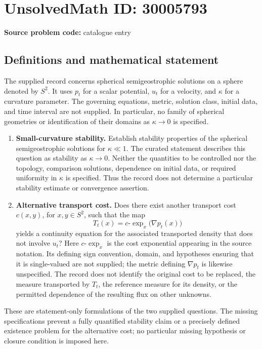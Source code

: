 \documentclass[11pt]{article}
\begin{document}
\section*{UnsolvedMath ID: 30005793}
\textbf{Source problem code:} catalogue entry
\subsection{Definitions and mathematical statement}
The supplied record concerns spherical semigeostrophic solutions on a sphere denoted by \(S^2\). It uses \(p_t\) for a scalar potential, \(u_t\) for a velocity, and \(\kappa\) for a curvature parameter. The governing equations, metric, solution class, initial data, and time interval are not supplied. In particular, no family of spherical geometries or identification of their domains as \(\kappa\to0\) is specified.

\begin{enumerate}
\item \textbf{Small-curvature stability.} Establish stability properties of the spherical semigeostrophic solutions for \(\kappa\ll1\). The curated statement describes this question as stability as \(\kappa\to0\). Neither the quantities to be controlled nor the topology, comparison solutions, dependence on initial data, or required uniformity in \(\kappa\) is specified. Thus the record does not determine a particular stability estimate or convergence assertion.
\item \textbf{Alternative transport cost.} Does there exist another transport cost \(c(x,y)\), for \(x,y\in S^2\), such that the map
\[
T_t(x)=c\text{-}\exp_x\bigl(\nabla p_t(x)\bigr)
\]
yields a continuity equation for the associated transported density that does not involve \(u_t\)? Here \(c\text{-}\exp_x\) is the cost exponential appearing in the source notation. Its defining sign convention, domain, and hypotheses ensuring that it is single-valued are not supplied; the metric defining \(\nabla p_t\) is likewise unspecified. The record does not identify the original cost to be replaced, the measure transported by \(T_t\), the reference measure for its density, or the permitted dependence of the resulting flux on other unknowns.
\end{enumerate}

These are statement-only formulations of the two supplied questions. The missing specifications prevent a fully quantified stability claim or a precisely defined existence problem for the alternative cost; no particular missing hypothesis or closure condition is imposed here.
\end{document}
